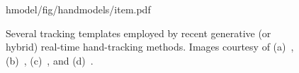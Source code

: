 \providecommand{\yoff}{0}
\begin{figure}[t!]
\centering
\begin{overpic} 
[width=\linewidth]
{hmodel/fig/handmodels/item.pdf}
\end{overpic}
\caption{
% 
%
Several tracking templates employed by recent generative (or hybrid) real-time hand-tracking methods.
% 
Images courtesy of
(a)~\protect\cite{oiko2011hand},
(b)~\protect\cite{sridhar2013multicam}, 
(c)~\protect\cite{taylor2016concerto}, and
(d)~\protect\cite{melax2013dynamics}.
% 
% 
}
\label{fig:handmodels}
\end{figure}

